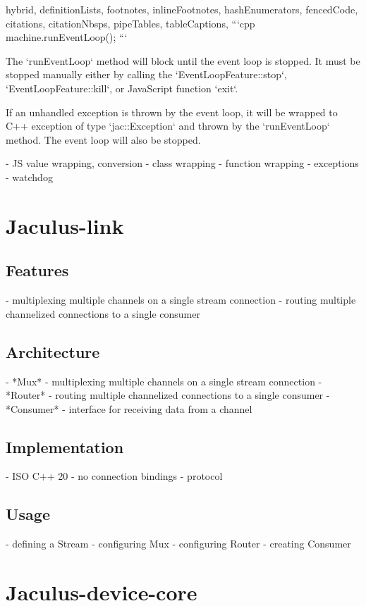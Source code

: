 \documentclass[
  digital,
  oneside,
  nosansbold,
  nocolorbold,
  lof,
  lot
]{fithesis4}
\begin{document}
\begin{markdown*}{%
  hybrid,
  definitionLists,
  footnotes,
  inlineFootnotes,
  hashEnumerators,
  fencedCode,
  citations,
  citationNbsps,
  pipeTables,
  tableCaptions,
}
```cpp
machine.runEventLoop();
```

The `runEventLoop` method will block until the event loop is stopped. It must be stopped manually either by calling the `EventLoopFeature::stop`, `EventLoopFeature::kill`, or JavaScript function `exit`.

If an unhandled exception is thrown by the event loop, it will be wrapped to C++ exception of type `jac::Exception` and thrown by the `runEventLoop` method. The event loop will also be stopped.


  - JS value wrapping, conversion
  - class wrapping
  - function wrapping
  - exceptions
  - watchdog

\chapter{Jaculus-link}

\section{Features}

  - multiplexing multiple channels on a single stream connection
  - routing multiple channelized connections to a single consumer

\section{Architecture}

  - *Mux* - multiplexing multiple channels on a single stream connection
  - *Router* - routing multiple channelized connections to a single consumer
  - *Consumer* - interface for receiving data from a channel

\section{Implementation}

  - ISO C++ 20
  - no connection bindings
  - protocol

\section{Usage}

  - defining a Stream
  - configuring Mux
  - configuring Router
  - creating Consumer


\chapter{Jaculus-device-core}


\end{markdown*}
\end{document}
